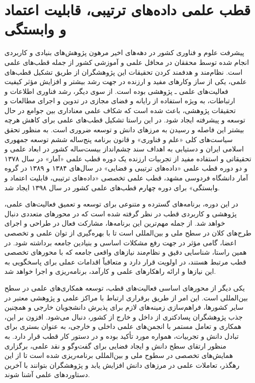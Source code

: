 \documentclass[
  letterpaper,
  DIV=11,
  numbers=noendperiod]{scrreprt}
\begin{document}
\section{قطب علمی داده‌های ترتیبی، قابلیت اعتماد و
وابستگی}\label{ux642ux637ux628-ux639ux644ux645ux6cc-ux62fux627ux62fux647ux647ux627ux6cc-ux62aux631ux62aux6ccux628ux6cc-ux642ux627ux628ux644ux6ccux62a-ux627ux639ux62aux645ux627ux62f-ux648-ux648ux627ux628ux633ux62aux6afux6cc}

پیشرفت علوم و فناوری کشور در دهه‌های اخیر مرهون پژوهش‌های بنیادی و کاربردی
انجام شده توسط محققان در محافل علمی و آموزشی کشور از جمله قطب‌های علمی
است. نظام‌مند و هدفمند کردن تحقیقات این پژوهشگران از طریق تشکیل قطب‌های
علمی، یکی از ساز وکارهای مفید و ارزنده در جهت رشد بیشتر و افزایش مؤثر
کیفیت فعالیت‌های علمی ـ پژوهشی بوده است. از سوی دیگر، رشد فناوری اطلاعات
و ارتباطات، به ویژه استفاده از رایانه و فضای مجازی در تدوین و اجرای
مطالعات و تحقیقات پژوهشی، باعث شده است که شکاف علمی معناداری بین جوامع
در حال توسعه و پیشرفته ایجاد شود. در این راستا تشکیل قطب‌های علمی برای
کاهش هرچه بیشتر این فاصله و رسیدن به مرزهای دانش و توسعه ضروری است. به
منظور تحقق سیاست‌های کلی «علم و فناوری» و قانون برنامه پنج‌ساله ششم توسعه
جمهوری اسلامی ایران و دستیابی به اهداف سند چشم‌انداز بیست‌ساله کشور در
ابعاد علمی و تحقیقاتی و استفاده مفید از تجربیات ارزنده یک دوره قطب علمی
«آمار» در سال ۱۳۷۸ و دو دوره قطب علمی «داده‌های ترتیبی و فضایی» در سال‌های
۱۳۸۴ و ۱۳۸۹ در گروه آمار دانشگاه فردوسی مشهد، قطب علمی تخصصی «داده‌های
ترتیبی، قابلیت اعتماد و وابستگی» برای دوره چهارم قطب‌های علمی کشور در سال
۱۳۹۸ ایجاد شد.

در این دوره، برنامه‌های گسترده و متنوعی برای توسعه و تعمیق فعالیت‌های
علمی، پژوهشی و کاربردی قطب در نظر گرفته شده است که در محورهای متعددی
دنبال خواهد شد. از جمله مهم‌ترین این برنامه‌ها، مشارکت فعال در طراحی و
اجرای طرح‌های کلان در سطح ملی و بین‌المللی است تا با بهره‌گیری از توان علمی
و تخصصی اعضا، گامی مؤثر در جهت رفع مشکلات اساسی و بنیادین جامعه برداشته
شود. در همین راستا، شناسایی دقیق و نظام‌مند نیازهای واقعی جامعه که با
محورهای تخصصی قطب مرتبط هستند، در اولویت قرار دارد و متعاقباً اقدامات
عملی برای پاسخگویی به این نیازها و ارائه راهکارهای علمی و کارآمد،
برنامه‌ریزی و اجرا خواهد شد.

یکی دیگر از محورهای اساسی فعالیت‌های قطب، توسعه همکاری‌های علمی در سطح
بین‌المللی است. این امر از طریق برقراری ارتباط با مراکز علمی و پژوهشی
معتبر در سایر کشورها، فراهم‌سازی زمینه‌های لازم برای پذیرش دانشجویان خارجی
و همچنین جذب پژوهشگران پسادکتری از داخل و خارج از کشور، دنبال می‌شود.
افزون بر این، همکاری و تعامل مستمر با انجمن‌های علمی داخلی و خارجی، به
عنوان بستری برای تبادل دانش و تجربیات، همواره مورد تأکید بوده و در دستور
کار قطب قرار دارد. به منظور ارتقای سطح دانش و ایجاد فضایی برای گفت‌وگو و
نقد علمی، برگزاری همایش‌های تخصصی در سطوح ملی و بین‌المللی برنامه‌ریزی شده
است تا از این رهگذر، تعاملات علمی در مرزهای دانش افزایش یابد و پژوهشگران
بتوانند با آخرین دستاوردهای علمی آشنا شوند.
\end{document}
